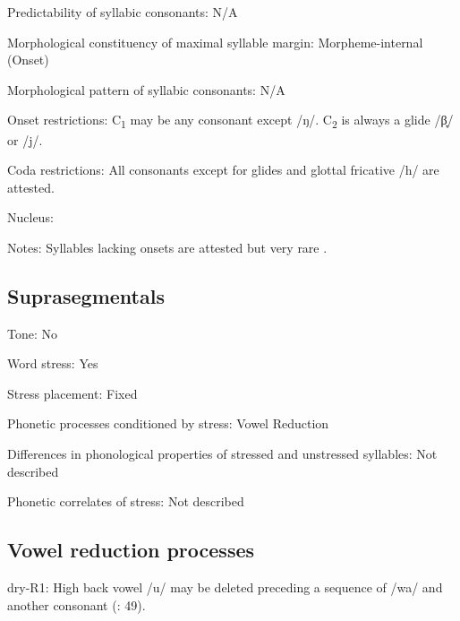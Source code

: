 {\begin{appendixdesc}
\item[Predictability of syllabic consonants:] N/A

\item[Morphological constituency of maximal syllable margin:] Morpheme-internal (Onset)

\item[Morphological pattern of syllabic consonants:] N/A

\item[Onset restrictions:] C\textsubscript{1} may be any consonant except /ŋ/. C\textsubscript{2} is always a glide /β̞/ or /j/.

\item[Coda restrictions:] All consonants except for glides and glottal fricative /h/ are attested.

\item[Nucleus:]

\item[Notes:] Syllables lacking onsets are attested but very rare \citep[19]{Dhakal2012}.
\end{appendixdesc}
\subsection*{Suprasegmentals}
\begin{appendixdesc}
\item[Tone:] No

\item[Word stress:] Yes

\item[Stress placement:] Fixed

\item[Phonetic processes conditioned by stress:] Vowel Reduction

\item[Differences in phonological properties of stressed and unstressed syllables:] Not described

\item[Phonetic correlates of stress:] Not described
\end{appendixdesc}
\subsection*{Vowel reduction processes}
\begin{appendixdesc}

\item[dry-R1:] High back vowel /u/ may be deleted preceding a sequence of /wa/ and another consonant (\citealt{KotapishKotapish1973}: 49).
\end{appendixdesc}
}
